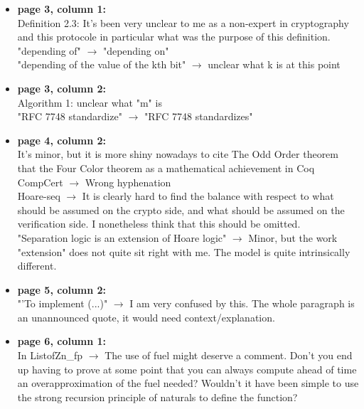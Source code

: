 \begin{itemize}

    \item \textbf{page 3, column 1:}\\
          Definition 2.3: It's been very unclear to me as a non-expert in cryptography and this protocole in particular what was the purpose of this definition.\\
          {\color{gray}"depending of" $\rightarrow$ "depending on"}\\
          "depending of the value of the kth bit" $\rightarrow$ unclear what k is at this point

    \item \textbf{page 3, column 2:}\\
          Algorithm 1: unclear what "m" is\\
          {\color{gray}"RFC 7748 standardize" $\rightarrow$   "RFC 7748 standardizes"}

    \item \textbf{page 4, column 2:}\\
          It's minor, but it is more shiny nowadays to cite The Odd Order theorem that the Four Color theorem as a mathematical achievement in Coq\\
          CompCert $\rightarrow$ Wrong hyphenation\\
          Hoare-seq $\rightarrow$ It is clearly hard to find the balance with respect to what should be assumed on the crypto side, and what should be assumed on the verification side. I nonetheless think that this should be omitted.\\
          "Separation logic is an extension of Hoare logic" $\rightarrow$ Minor, but the work "extension" does not quite sit right with me. The model is quite intrinsically different.

    \item \textbf{page 5, column 2:}\\
          "'To implement (...)" $\rightarrow$ I am very confused by this. The whole paragraph is an unannounced quote, it would need context/explanation.

    \item \textbf{page 6, column 1:}\\
          In ListofZn\_fp $\rightarrow$ The use of fuel might deserve a comment. Don't you end up having to prove at some point that you can always compute ahead of time an overapproximation of the fuel needed? Wouldn't it have been simple to use the strong recursion principle of naturals to define the function?


\end{itemize}

